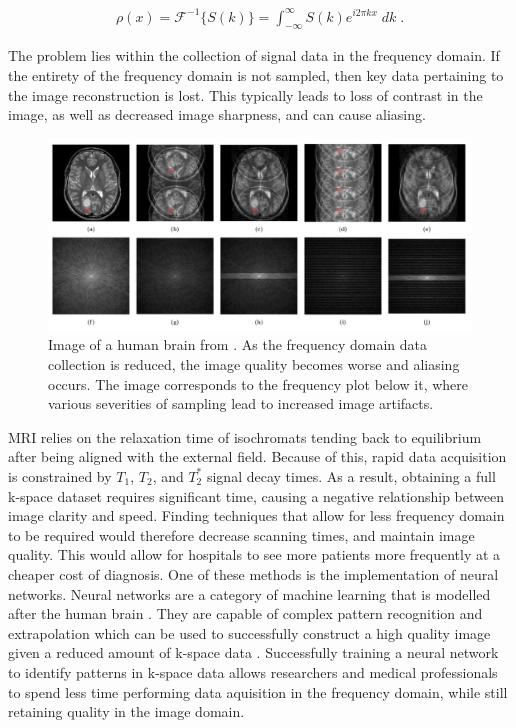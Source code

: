 \documentclass[14pt]{extreport}
\begin{document}
        \begin{align}
            \rho(x) = \mathcal{F}^{-1}\{ S(k) \} = \int_{-\infty}^{\infty} S(k) e^{i 2\pi k x} \;dk\;. \label{fft}
        \end{align}

        The problem lies within the collection of signal data in the frequency domain. If the entirety of the frequency domain is not sampled, then key data pertaining to the image reconstruction is lost. This typically leads to loss of contrast in the image, as well as decreased image sharpness, and can cause aliasing. 
        
        \begin{figure}[h]
            \begin{center}
                \includegraphics[width = \linewidth]{Brain Images.png}
                \caption{Image of a human brain from \cite{Hyun_Kim_Lee_Lee_Seo_2018}. As the frequency domain data collection is reduced, the image quality becomes worse and aliasing occurs. The image corresponds to the frequency plot below it, where various severities of sampling lead to increased image artifacts.}
            \end{center}
        \end{figure}

        MRI relies on the relaxation time of isochromats tending back to equilibrium after being aligned with the external field. Because of this, rapid data acquisition is constrained by $T_1$, $T_2$, and $T_2^*$ signal decay times. As a result, obtaining a full k-space dataset requires significant time, causing a negative relationship between image clarity and speed. Finding techniques that allow for less frequency domain to be required would therefore decrease scanning times, and maintain image quality. This would allow for hospitals to see more patients more frequently at a cheaper cost of diagnosis. One of these methods is the implementation of neural networks. Neural networks are a category of machine learning that is modelled after the human brain \cite{Pytorch_Book}. They are capable of complex pattern recognition and extrapolation which can be used to successfully construct a high quality image given a reduced amount of k-space data \cite{Hammernik_Klatzer_Kobler_Recht_Sodickson_Pock_Knoll_2018}. Successfully training a neural network to identify patterns in k-space data allows researchers and medical professionals to spend less time performing data aquisition in the frequency domain, while still retaining quality in the image domain.
    
\end{document}
